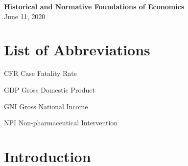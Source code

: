 \documentclass[12pt,a4paper]{article}
\begin{document}
\begin{center}
  \textbf{Historical and Normative Foundations of Economics} \\\vspace{0.5cm}
  June 11, 2020
  
\end{center}


\pagebreak
\pagestyle{plain}
\tableofcontents
\pagebreak
\listoffigures
\newpage
\renewcommand\lstlistlistingname{List of R Code Chunks}
\lstlistoflistings
\newpage
{}
 
\section*{List of Abbreviations}
 
\begin{abbrv}
 
\item[CFR]			Case Fatality Rate
\item[GDP]			Gross Domestic Product
\item[GNI]			Gross National Income
\item[NPI]			Non-pharmaceutical Intervention

\end{abbrv}
\newpage
\setcounter{page}{2}
\setlength{\baselineskip}{1.5\baselineskip}
\pagestyle{plain}


\section{Introduction}

\end{document}
